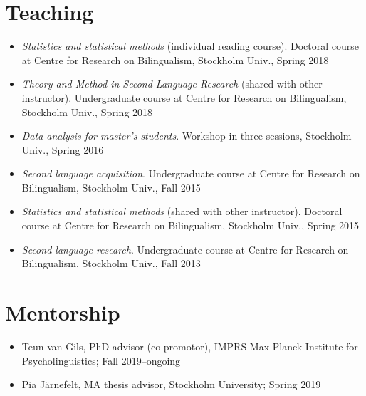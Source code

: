 \documentclass[margin, 11pt]{res} %
\begin{document}
\begin{resume}


\section{\sc Teaching}

\begin{itemize}

\item \textit{Statistics and statistical methods} (individual reading course). Doctoral course at Centre for Research on Bilingualism, Stockholm Univ., Spring 2018

\item \textit{Theory and Method in Second Language Research} (shared with other instructor). Undergraduate course at Centre for Research on Bilingualism, Stockholm Univ., Spring 2018

\item \textit{Data analysis for master's students}. Workshop in three sessions, Stockholm Univ., Spring 2016

\item \textit{Second language acquisition}. Undergraduate course at Centre for Research on Bilingualism, Stockholm Univ., Fall 2015

\item \textit{Statistics and statistical methods} (shared with other instructor). Doctoral course at Centre for Research on Bilingualism, Stockholm Univ., Spring 2015

\item \textit{Second language research}. Undergraduate course at Centre for Research on Bilingualism, Stockholm Univ., Fall 2013 

\end{itemize}


\section{\sc Mentorship}

\begin{itemize}

\item Teun van Gils, PhD advisor (co-promotor), IMPRS Max Planck Institute for Psycholinguistics; Fall 2019--ongoing

\item Pia Järnefelt, MA thesis advisor, Stockholm University; Spring 2019


\end{itemize}
\end{resume}
\end{document}
